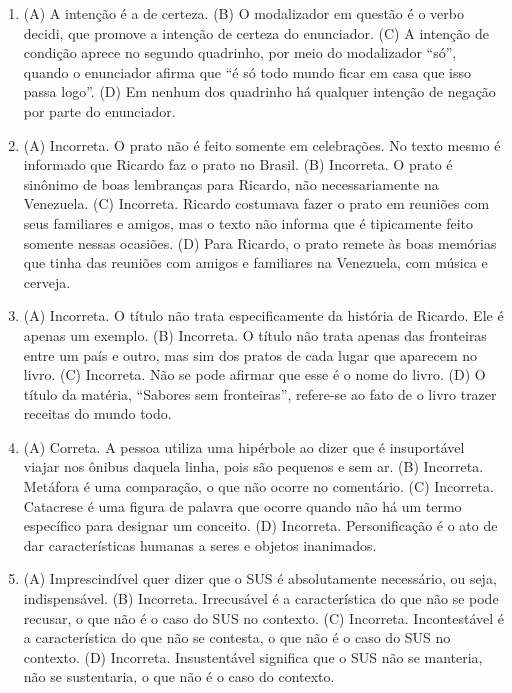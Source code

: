 \begin{enumerate}
\item (A) A intenção é a de certeza.
(B) O modalizador em questão é o verbo decidi, que promove a intenção de
certeza do enunciador.
(C) A intenção de condição aprece no segundo quadrinho, por meio do
modalizador ``só'', quando o enunciador afirma que ``é só todo mundo
ficar em casa que isso passa logo''.
(D) Em nenhum dos quadrinho há qualquer intenção de negação por parte do
enunciador.

\item (A) Incorreta. O prato não é feito somente em celebrações. No texto mesmo
é informado que Ricardo faz o prato no Brasil.
(B) Incorreta. O prato é sinônimo de boas lembranças para Ricardo, não
necessariamente na Venezuela.
(C) Incorreta. Ricardo costumava fazer o prato em reuniões com seus
familiares e amigos, mas o texto não informa que é tipicamente feito
somente nessas ocasiões.
(D) Para Ricardo, o prato remete às boas memórias que tinha das reuniões
com amigos e familiares na Venezuela, com música e cerveja.

\item (A) Incorreta. O título não trata especificamente da história de Ricardo.
Ele é apenas um exemplo.
(B) Incorreta. O título não trata apenas das fronteiras entre um país e
outro, mas sim dos pratos de cada lugar que aparecem no livro.
(C) Incorreta. Não se pode afirmar que esse é o nome do livro.
(D) O título da matéria, ``Sabores sem fronteiras'', refere-se ao fato de
o livro trazer receitas do mundo todo.

\item (A) Correta. A pessoa utiliza uma hipérbole ao dizer que é insuportável
viajar nos ônibus daquela linha, pois são pequenos e sem ar.
(B) Incorreta. Metáfora é uma comparação, o que não ocorre no comentário.
(C) Incorreta. Catacrese é uma figura de palavra que ocorre quando não há
um termo específico para designar um conceito.
(D) Incorreta. Personificação é o ato de dar características humanas a
seres e objetos inanimados.

\item (A) Imprescindível quer dizer que o SUS é absolutamente necessário, ou
seja, indispensável.
(B) Incorreta. Irrecusável é a característica do que não se pode recusar,
o que não é o caso do SUS no contexto.
(C) Incorreta. Incontestável é a característica do que não se contesta, o
que não é o caso do SUS no contexto.
(D) Incorreta. Insustentável significa que o SUS não se manteria, não se
sustentaria, o que não é o caso do contexto.


\end{enumerate}

